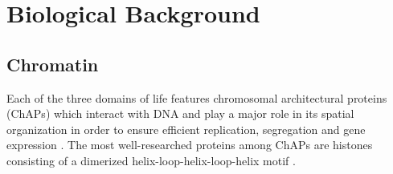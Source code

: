 \chapter{Biological Background}
    \label{cha:biologicalBackground}


    \section{Chromatin}
        Each of the three domains of life features chromosomal architectural proteins (ChAPs) which interact with DNA and play a major role in its spatial organization in order to ensure efficient replication, segregation and gene expression \cite{prohaska2010innovation}. The most well-researched proteins among ChAPs are histones consisting of a dimerized helix-loop-helix-loop-helix motif \cite{selleck2001histone}.

